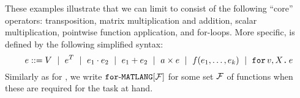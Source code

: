 These examples illustrate that we can limit \langfor to consist of the following ``core'' operators: transposition, matrix multiplication and addition, scalar multiplication, pointwise function application, and for-loops. More specific, \langfor is defined by the following simplified syntax:
$$
e ::= V \ \mid \ e^T \ \mid \ e_1 \cdot e_2 \ \mid \ e_1 + e_2 \ \mid \ a\times e  \ \mid \  f(e_1,\ldots ,e_k) \ \mid \ \ffor{v}{X}{e}
$$
Similarly as for \lang, we write $\texttt{for}\text{-}\texttt{MATLANG}[\mathcal{F}]$ for some set $\mathcal{F}$ of functions when these are required for the task at hand.




